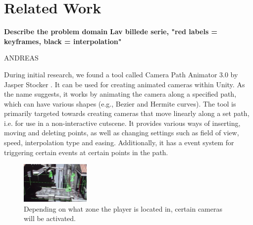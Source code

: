 \section{Related Work}\label{relatedWork}

\textbf{Describe the problem domain}
\textbf{Lav billede serie, "red labels = keyframes, black = interpolation"}

ANDREAS

During initial research, we found a tool called Camera Path Animator 3.0 by Jasper Stocker  \cite{unity_camTool}. It can be used for creating animated cameras within Unity. As the name suggests, it works by animating the camera along a specified path, which can have various shapes (e.g., Bezier and Hermite curves). The tool is primarily targeted towards creating cameras that move linearly along a set path, i.e. for use in a non-interactive cutscene. It provides various ways of inserting, moving and deleting points, as well as changing settings such as field of view, speed, interpolation type and easing. Additionally, it has a event system for triggering certain events at certain points in the path.



\begin{figure}[htbp]
\centering
\includegraphics[width=0.30\textwidth]{Pics/gow_cameraZones}
\caption{Depending on what zone the player is located in, certain cameras will be activated.}
\label{fig:gow_zones}
\end{figure}

